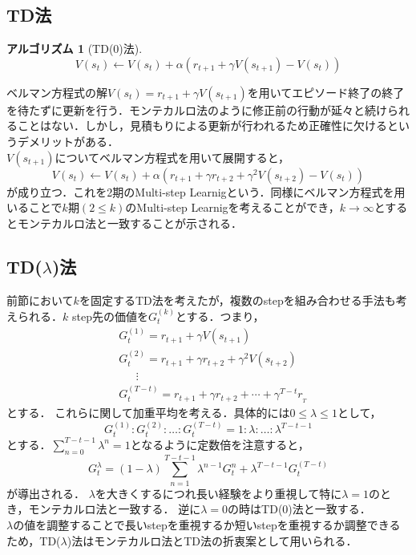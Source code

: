 \documentclass[a4paper,12pt]{jsreport}
\theoremstyle{definition}
\newtheorem{algorithm}{アルゴリズム}
\begin{document}
\subsection{TD法}
\begin{algorithm}[TD(0)法]
    \begin{equation}
        V(s_t)\leftarrow V(s_t)+\alpha(r_{t+1}+\gamma V(s_{t+1})-V(s_t))
    \end{equation}
\end{algorithm}
ベルマン方程式の解$V(s_t)=r_{t+1}+\gamma V(s_{t+1})$を用いてエピソード終了の終了を待たずに更新を行う．モンテカルロ法のように修正前の行動が延々と続けられることはない．しかし，見積もりによる更新が行われるため正確性に欠けるというデメリットがある．\\
$V(s_{t+1})$についてベルマン方程式を用いて展開すると，
\begin{equation}
    V(s_t)\leftarrow V(s_t)+\alpha(r_{t+1}+\gamma r_{t+2}+\gamma^2 V(s_{t+2})-V(s_t))
\end{equation}
が成り立つ．これを2期のMulti-step Learnigという．同様にベルマン方程式を用いることで$k$期$(2\leq k)$のMulti-step Learnigを考えることができ，$k\to \infty$とするとモンテカルロ法と一致することが示される．

\subsection{TD($\lambda$)法}
前節において$k$を固定するTD法を考えたが，複数のstepを組み合わせる手法も考えられる．$k$ step先の価値を$G_t^{(k)}$とする．つまり，
\begin{align*}
    &G_t^{(1)}=r_{t+1}+\gamma V(s_{t+1})\\
    &G_t^{(2)}=r_{t+1}+\gamma r_{t+2}+\gamma^2 V(s_{t+2})\\
    &\ \ \ \  \ \ \ \vdots\\
    &G_t^{(T-t)}=r_{t+1}+\gamma r_{t+2}+\cdots+\gamma^{T-t} r_{_T}
\end{align*}
とする．
これらに関して加重平均を考える．具体的には$0\leq\lambda\leq 1$として，
\begin{equation}
    G_t^{(1)}:G_t^{(2)}:\ldots:G_t^{(T-t)}=1:\lambda:\ldots:\lambda^{T-t-1}
\end{equation}
とする．$\displaystyle \sum_{n=0}^{T-t-1}\lambda^n=1$となるように定数倍を注意すると，
\begin{equation}
    G_t^{\lambda}=(1-\lambda)\sum_{n=1}^{T-t-1}\lambda^{n-1}G_t^{n}+\lambda^{T-t-1}G_t^{(T-t)}
\end{equation}
が導出される．
$\lambda$を大きくするにつれ長い経験をより重視して特に$\lambda=1$のとき，モンテカルロ法と一致する．
逆に$\lambda=0$の時はTD(0)法と一致する．\\
$\lambda$の値を調整することで長いstepを重視するか短いstepを重視するか調整できるため，TD($\lambda$)法はモンテカルロ法とTD法の折衷案として用いられる．
\end{document}
